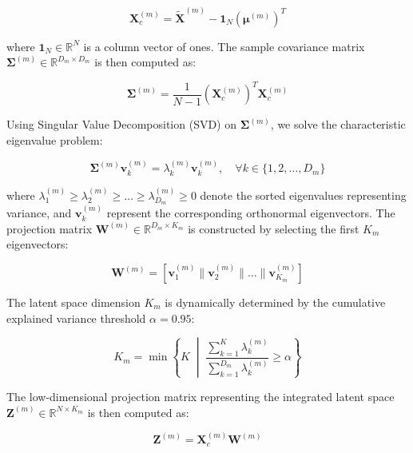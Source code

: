 \documentclass[12pt,a4paper,onecolumn]{article}
\begin{document}
\begin{equation}
\mathbf{X}_c^{(m)} = \tilde{\mathbf{X}}^{(m)} - \mathbf{1}_N \left(\boldsymbol{\mu}^{(m)}\right)^T
\end{equation}

where $\mathbf{1}_N \in \mathbb{R}^N$ is a column vector of ones. The sample covariance matrix $\boldsymbol{\Sigma}^{(m)} \in \mathbb{R}^{D_m \times D_m}$ is then computed as:

\begin{equation}
\boldsymbol{\Sigma}^{(m)} = \frac{1}{N-1} \left(\mathbf{X}_c^{(m)}\right)^T \mathbf{X}_c^{(m)}
\end{equation}

Using Singular Value Decomposition (SVD) on $\boldsymbol{\Sigma}^{(m)}$, we solve the characteristic eigenvalue problem:

\begin{equation}
\boldsymbol{\Sigma}^{(m)} \mathbf{v}_k^{(m)} = \lambda_k^{(m)} \mathbf{v}_k^{(m)}, \quad \forall k \in \{1, 2, \dots, D_m\}
\end{equation}

where $\lambda_1^{(m)} \ge \lambda_2^{(m)} \ge \dots \ge \lambda_{D_m}^{(m)} \ge 0$ denote the sorted eigenvalues representing variance, and $\mathbf{v}_k^{(m)}$ represent the corresponding orthonormal eigenvectors. The projection matrix $\mathbf{W}^{(m)} \in \mathbb{R}^{D_m \times K_m}$ is constructed by selecting the first $K_m$ eigenvectors:

\begin{equation}
\mathbf{W}^{(m)} = \left[ \mathbf{v}_1^{(m)} \parallel \mathbf{v}_2^{(m)} \parallel \dots \parallel \mathbf{v}_{K_m}^{(m)} \right]
\end{equation}

The latent space dimension $K_m$ is dynamically determined by the cumulative explained variance threshold $\alpha = 0.95$:

\begin{equation}
K_m = \min \left\{ K \;\middle|\; \frac{\sum_{k=1}^K \lambda_k^{(m)}}{\sum_{k=1}^{D_m} \lambda_k^{(m)}} \ge \alpha \right\}
\end{equation}

The low-dimensional projection matrix representing the integrated latent space $\mathbf{Z}^{(m)} \in \mathbb{R}^{N \times K_m}$ is then computed as:

\begin{equation}
\mathbf{Z}^{(m)} = \mathbf{X}_c^{(m)} \mathbf{W}^{(m)}
\end{equation}
\end{document}
